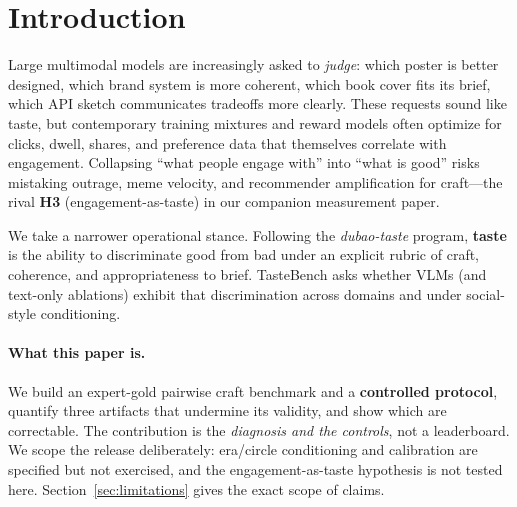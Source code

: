 \documentclass[11pt,a4paper]{article}
\begin{document}
\section{Introduction}
\label{sec:intro}

Large multimodal models are increasingly asked to \emph{judge}: which poster is better designed, which brand system is more coherent, which book cover fits its brief, which API sketch communicates tradeoffs more clearly. These requests sound like taste, but contemporary training mixtures and reward models often optimize for clicks, dwell, shares, and preference data that themselves correlate with engagement. Collapsing ``what people engage with'' into ``what is good'' risks mistaking outrage, meme velocity, and recommender amplification for craft---the rival \textbf{H3} (engagement-as-taste) in our companion measurement paper.

We take a narrower operational stance. Following the \emph{dubao-taste} program, \textbf{taste} is the ability to discriminate good from bad under an explicit rubric of craft, coherence, and appropriateness to brief. TasteBench asks whether VLMs (and text-only ablations) exhibit that discrimination across domains and under social-style conditioning.

\paragraph{What this paper is.}
We build an expert-gold pairwise craft benchmark and a \textbf{controlled protocol}, quantify three artifacts that undermine its validity, and show which are correctable. The contribution is the \emph{diagnosis and the controls}, not a leaderboard. We scope the release deliberately: era/circle conditioning and calibration are specified but not exercised, and the engagement-as-taste hypothesis is not tested here. Section~\ref{sec:limitations} gives the exact scope of claims.
\end{document}
